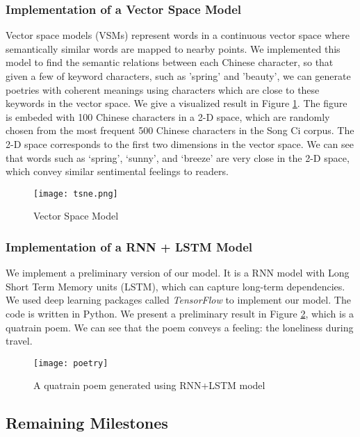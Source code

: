 \subsubsection{ Implementation of a Vector Space Model }
Vector space models (VSMs) represent words in a continuous vector space where semantically similar words are mapped to nearby points.
%
We implemented this model to find the semantic relations between each Chinese character, so that given a few of keyword characters, such as 'spring' and 'beauty', we can generate poetries with coherent meanings using characters which are close to these keywords in the vector space.
%
%
We give a visualized result in Figure \ref{fig:VSM}. The figure is embeded with 100 Chinese characters in a 2-D space, which are randomly chosen from the most frequent 500 Chinese characters in the Song Ci corpus. The 2-D space corresponds to the first two dimensions in the vector space. We can see that words such as `spring', `sunny', and `breeze' are very close in the 2-D space, which convey similar sentimental feelings to readers. 


\begin{figure}[htbp]
	\centering
	\texttt{[image: tsne.png]}
	\caption{Vector Space Model}
	\label{fig:VSM}
\end{figure}
\subsubsection{ Implementation of a RNN + LSTM Model  }
We implement a preliminary version of our model. It is a RNN model with Long Short Term Memory units (LSTM), which can capture long-term dependencies. 
%
We used deep learning packages called \emph{TensorFlow} \cite{tensorflow} to implement our model. The code is written in Python.
%
We present a preliminary result in Figure \ref{fig:poetry}, which is a quatrain poem. We can see that the poem conveys a feeling: the loneliness during travel. 


\begin{figure}[htbp]
	\centering
	\texttt{[image: poetry]}
	\caption{A quatrain poem generated using RNN+LSTM model}
	\label{fig:poetry}
\end{figure}


\subsection{Remaining Milestones}
%
